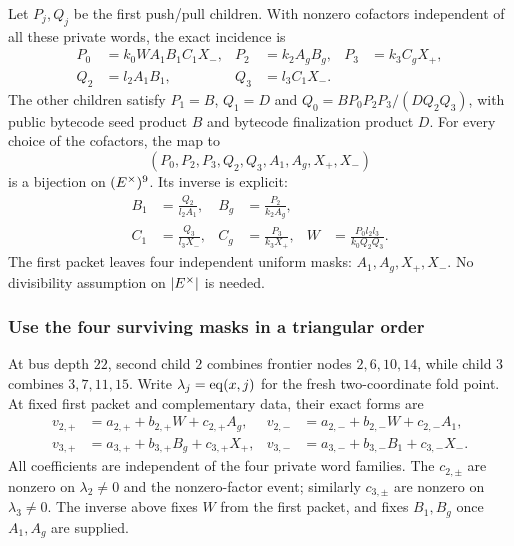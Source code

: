 Let $P_j,Q_j$ be the first push/pull children. With nonzero cofactors independent of all these private words, the exact incidence is
\[
\begin{aligned}
 P_0&=k_0WA_1B_1C_1X_-,& P_2&=k_2A_gB_g,& P_3&=k_3C_gX_+,\\
 Q_2&=l_2A_1B_1,& Q_3&=l_3C_1X_-.
\end{aligned}
\]
The other children satisfy $P_1=B$, $Q_1=D$ and $Q_0=BP_0P_2P_3/(DQ_2Q_3)$, with public bytecode seed product $B$ and bytecode finalization product $D$. For every choice of the cofactors, the map to
\[
 (P_0,P_2,P_3,Q_2,Q_3,A_1,A_g,X_+,X_-)
\]
is a bijection on $(E^\times)^9$. Its inverse is explicit:
\[
\begin{aligned}
 B_1&=\frac{Q_2}{l_2A_1},& B_g&=\frac{P_2}{k_2A_g},\\
 C_1&=\frac{Q_3}{l_3X_-},& C_g&=\frac{P_3}{k_3X_+},&
 W&=\frac{P_0l_2l_3}{k_0Q_2Q_3}.
\end{aligned}
\]
The first packet leaves four independent uniform masks: $A_1,A_g,X_+,X_-$. No divisibility assumption on $|E^\times|$ is needed.

\subsubsection{Use the four surviving masks in a triangular order}

At bus depth $22$, second child $2$ combines frontier nodes $2,6,10,14$, while child $3$ combines $3,7,11,15$. Write $\lambda_j=\operatorname{eq}(x,j)$ for the fresh two-coordinate fold point. At fixed first packet and complementary data, their exact forms are
\[
\begin{aligned}
 v_{2,+}&=a_{2,+}+b_{2,+}W+c_{2,+}A_g,&
 v_{2,-}&=a_{2,-}+b_{2,-}W+c_{2,-}A_1,\\
 v_{3,+}&=a_{3,+}+b_{3,+}B_g+c_{3,+}X_+,&
 v_{3,-}&=a_{3,-}+b_{3,-}B_1+c_{3,-}X_-.
\end{aligned}
\]
All coefficients are independent of the four private word families. The $c_{2,\pm}$ are nonzero on $\lambda_2\ne0$ and the nonzero-factor event; similarly $c_{3,\pm}$ are nonzero on $\lambda_3\ne0$. The inverse above fixes $W$ from the first packet, and fixes $B_1,B_g$ once $A_1,A_g$ are supplied.

